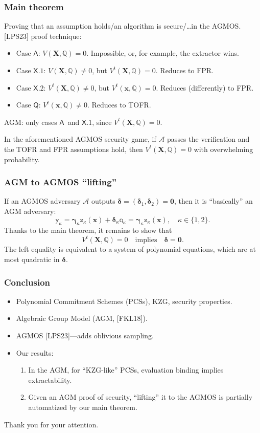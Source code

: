 \documentclass[9pt]{beamer}
\newcommand{\A}{\mathcal A}  %
\newcommand{\caseA}{\ensuremath{\mathsf{A}}}
\newcommand{\caseQ}{\ensuremath{\mathsf{Q}}}
\newcommand{\caseXone}{\ensuremath{\mathsf{X.1}}}
\newcommand{\caseXtwo}{\ensuremath{\mathsf{X.2}}}
\begin{document}
\begin{frame}
\frametitle{Main theorem}
Proving that an assumption holds/an algorithm is secure/\dots in the AGMOS. [LPS23] proof technique:
\begin{itemize}
    \item Case \caseA: $ V(\bm X, \mathbb Q) = 0 $. Impossible, or, for example, the extractor wins.
    \item Case \caseXone: $ V(\bm X, \mathbb Q) \neq 0 $, but $ V^t(\bm X, \mathbb Q) = 0 $. Reduces to FPR.
    \item Case \caseXtwo: $ V^t(\bm X, \mathbb Q) \neq 0 $, but $ V^t(\bm x, \mathbb Q) = 0 $. Reduces (differently) to FPR.
    \item Case \caseQ: $ V^t(\bm x, \mathbb Q) \neq 0 $. Reduces to TOFR.
\end{itemize}
AGM: only cases \caseA \ and \caseXone, since $ V^t(\bm X, \mathbb Q) = 0 $.
\begin{theorem}[informal]
    In the aforementioned AGMOS security game, if $ \A $ passes the verification and the TOFR and FPR assumptions hold, then $ V^t(\bm X, \mathbb Q) = 0 $ with overwhelming probability.
\end{theorem}
\end{frame}


\begin{frame}
\frametitle{AGM to AGMOS ``lifting''}
If an AGMOS adversary $ \A $ outputs $ \bm \delta = (\bm \delta_1, \bm \delta_2) = \bm 0 $, then it is ``basically'' an AGM adversary:
\[
\mathbb y_\kappa = 
\bm{\gamma}_\kappa \mathbb x_\kappa(\bm x) + \bm \delta_\kappa \mathbb q_\kappa = 
\bm{\gamma}_\kappa \mathbb x_\kappa(\bm x), \quad 
\kappa \in \{ 1, 2 \}.
\]
Thanks to the main theorem, it remains to show that
\[
V^t(\bm X, \mathbb Q) = 0 \quad \text{implies} \quad
\bm \delta = \bm 0.
\]
The left equality is equivalent to a system of polynomial equations, which are at most quadratic in $ \bm \delta $. 
\end{frame}


\begin{frame}
\frametitle{Conclusion}
\begin{itemize}
    \item Polynomial Commitment Schemes (PCSs), KZG, security properties.
    \item Algebraic Group Model (AGM, [FKL18]).
    \item AGMOS [LPS23]---adds oblivious sampling.
    \item Our results:
    \begin{enumerate}
        \item In the AGM, for ``KZG-like'' PCSs, evaluation binding implies extractability.
        \item Given an AGM proof of security, ``lifting'' it to the AGMOS is partially automatized by our main theorem.
    \end{enumerate}
\end{itemize}
\vfill
Thank you for your attention.
\end{frame}
\end{document}

